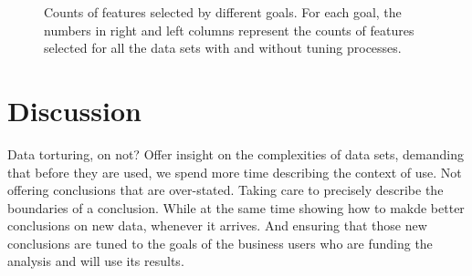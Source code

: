 \documentclass{sig-alternative}
\begin{document}
\begin{figure}[!ht]
\begin{tabular}{c|c c|c c|c c|c c| c c }
  \end{tabular}
    \caption{Counts of features selected by different goals. For each goal, the numbers in right and left columns represent the counts of features selected for all the data sets with and without tuning processes.}
\end{figure}



\section{Discussion}
Data torturing, on not? Offer insight on the complexities of data sets, demanding
that before they are used, we spend more time describing the context of use. Not offering
conclusions that are over-stated. Taking care to precisely describe the boundaries of a 
conclusion. While at the same time showing how to makde better conclusions on new
data, whenever it arrives. And ensuring that those new conclusions are tuned
to the goals of the business users who are funding the analysis and will use its results.
\end{document}
